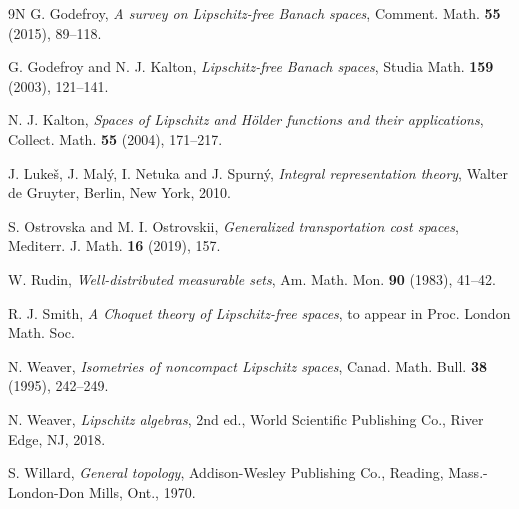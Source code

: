 \documentclass[a4paper,10pt]{amsart}
\theoremstyle{plain}
\theoremstyle{definition}
\theoremstyle{remark}
\begin{document}
\begin{thebibliography}{9N}
	G. Godefroy,
	\emph{A survey on Lipschitz-free Banach spaces},
	Comment. Math. \textbf{55} (2015), 89--118.

	G. Godefroy and N. J. Kalton,
	\emph{Lipschitz-free Banach spaces},
	Studia Math. \textbf{159} (2003), 121--141.

	N. J. Kalton,
	\emph{Spaces of Lipschitz and H\"older functions and their applications},
	Collect. Math. \textbf{55} (2004), 171--217.	

	J. Luke\v s, J. Mal\' y, I. Netuka and J. Spurn\'y,
	\emph{Integral representation theory},
	Walter de Gruyter, Berlin, New York, 2010.

	S. Ostrovska and M. I. Ostrovskii,
	\emph{Generalized transportation cost spaces},
	Mediterr. J. Math. \textbf{16} (2019), 157.

	W. Rudin,
	\emph{Well-distributed measurable sets},
	Am. Math. Mon. \textbf{90} (1983), 41--42.

	R. J. Smith,
	\emph{A Choquet theory of Lipschitz-free spaces},
	to appear in Proc. London Math. Soc.

	N. Weaver,
	\emph{Isometries of noncompact Lipschitz spaces},
	Canad. Math. Bull. \textbf{38} (1995), 242--249.

    N. Weaver,
	\emph{Lipschitz algebras}, 2nd ed.,
	World Scientific Publishing Co., River Edge, NJ, 2018.

    S. Willard,
    \emph{General topology},
    Addison-Wesley Publishing Co., Reading, Mass.-London-Don Mills, Ont., 1970. 

\end{thebibliography}
\end{document}
